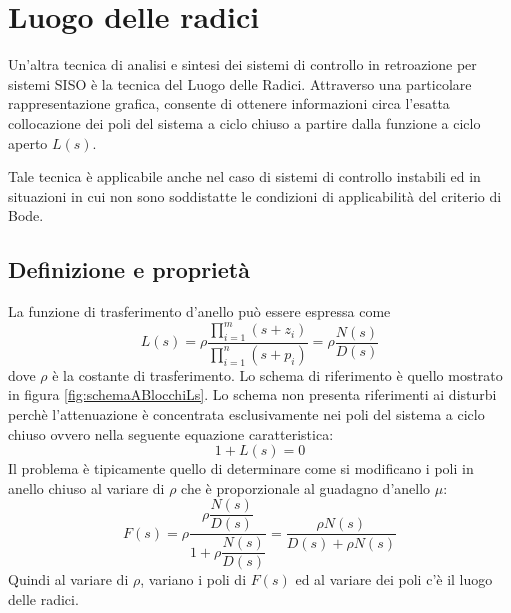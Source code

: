 \documentclass[a4paper]{report}
\begin{document}
\chapter{Luogo delle radici}
Un'altra tecnica di analisi e sintesi dei sistemi di controllo in
retroazione per sistemi SISO \`e la tecnica del Luogo delle
Radici. Attraverso una particolare rappresentazione grafica, consente
di ottenere informazioni circa l'esatta collocazione dei poli del
sistema a ciclo chiuso a partire dalla funzione a ciclo aperto $L(s)$.

Tale tecnica \`e applicabile anche nel caso di sistemi di controllo
instabili ed in situazioni in cui non sono soddistatte le condizioni
di applicabilit\`a del criterio di Bode.

\section{Definizione e propriet\`a}

La funzione di trasferimento d'anello pu\`o essere espressa come
\begin{equation}\label{eq:luogoRadiciLs}
L(s) = \rho \dfrac{\prod\limits_{i = 1}^{m} (s + z_i)}{\prod\limits_{i = 1}^{n} (s +
  p_i)} = \rho \dfrac{N(s)}{D(s)}
\end{equation}
dove $\rho$ \`e la costante di trasferimento. Lo schema di riferimento
\`e quello mostrato in figura \ref{fig:schemaABlocchiLs}. Lo schema
non presenta riferimenti ai disturbi perch\`e l'attenuazione \`e
concentrata esclusivamente nei poli del sistema a ciclo chiuso ovvero
nella seguente equazione caratteristica:
\begin{equation}
  1 + L(s) = 0
\end{equation}
Il problema \`e tipicamente quello di determinare come si modificano i
poli in anello chiuso al variare di $\rho$ che \`e proporzionale al
guadagno d'anello $\mu$:
\[
F(s) = \rho \dfrac{\rho \dfrac{N(s)}{D(s)}}{1 + \rho
  \dfrac{N(s)}{D(s)}} = \dfrac{\rho N(s)}{D(s) + \rho N(s)}
\]
Quindi al variare di $\rho$, variano i poli di $F(s)$ ed al variare
dei poli c'\`e il luogo delle radici.
\end{document}
